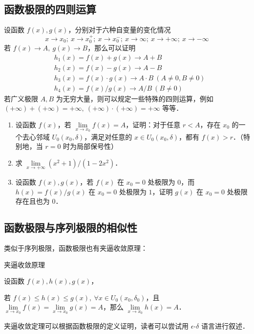 \subsection{函数极限的四则运算}
设函数 $f(x),g(x)$，分别对于六种自变量的变化情况
\begin{equation}
  x\rightarrow x_0;\ x\rightarrow x_0^+;\ x\rightarrow x_0^{-};\ x\rightarrow \infty;\ x\rightarrow +\infty;\ x\rightarrow -\infty
\end{equation}
  若 $f(x)\rightarrow A,\ g(x)\rightarrow B$，那么可以证明
\begin{equation}
  \begin{aligned}
  &h_1(x)=f(x)+g(x)\rightarrow A+B\\
  &h_2(x)=f(x)-g(x)\rightarrow A-B\\
  &h_3(x)=f(x)\cdot g(x)\rightarrow A\cdot B\ (A\neq 0,B\neq 0)\\
  &h_4(x)=f(x)/ g(x)\rightarrow A/B\ (B\neq 0)
  \end{aligned}
\end{equation}
  若广义极限 $A,B$ 为无穷大量，则可以规定一些特殊的四则运算，例如 $(+\infty)+(+\infty)=+\infty,\ 
  (+\infty)\cdot (+\infty)=+\infty$ 等等．
\begin{exercise}{}
\begin{enumerate}
\item  设函数 $f(x)$，若 $\lim\limits_{x\rightarrow x_0}f(x)=A$，证明：对于任意 $r<A$，存在 $x_0$ 的一个去心邻域 $U_0(x_0,\delta)$，满足对任意的 $x\in U_0(x_0,\delta)$，都有 $f(x)>r$．（特别地，当 $r=0$ 时为局部保号性）
\item 求 $\lim\limits_{x\rightarrow +\infty}(x^2+1)/(1-2x^2)$．
\item 设函数 $f(x),g(x)$，若 $f(x)$ 在 $x_0=0$ 处极限为 $0$，而 $h(x)=f(x)/g(x)$ 在 $x_0=0$ 处极限为 $1$，证明 $g(x)$ 在 $x_0=0$ 处极限存在且也为 $0$．
\end{enumerate}

\end{exercise}

\subsection{函数极限与序列极限的相似性}

类似于序列极限，函数极限也有夹逼收敛原理：
\begin{theorem}{夹逼收敛原理}

  设函数 $f(x),h(x),g(x)$，

  若 $f(x)\le h(x)\le g(x),\ \forall x\in U_0(x_0,\delta_0)$，且 $\lim\limits_{x\rightarrow x_0}f(x)=\lim\limits_{x\rightarrow x_0} g(x)=A$，那么 $\lim\limits_{x\rightarrow x_0}h(x)=A$．
\end{theorem}
夹逼收敛定理可以根据函数极限的定义证明，读者可以尝试用 $\epsilon$-$\delta$ 语言进行叙述．


